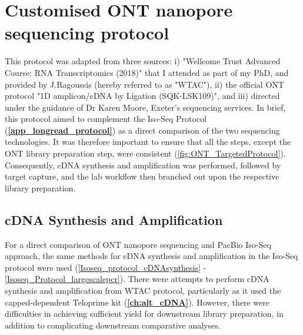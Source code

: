 \chapter{Customised ONT nanopore sequencing protocol}
\label{app_longread_ont_protocol}

\stoptocwriting
This protocol was adapted from three sources: i) "Wellcome Trust Advanced Course: RNA Transcriptomics (2018)" that I attended as part of my PhD, and provided by J.Ragoussis (hereby referred to as "WTAC"), ii) the official ONT protocol "1D amplicon/cDNA by Ligation (SQK-LSK109)", and iii) directed under the guidance of Dr Karen Moore, Exeter's sequencing services. In brief, this protocol aimed to complement the Iso-Seq Protocol (\textbf{\cref{app_longread_protocol}}) as a direct comparison of the two sequencing technologies. It was therefore important to ensure that all the steps, except the ONT library preparation step, were consistent (\cref{fig:ONT_TargetedProtocol}). Consequently, cDNA synthesis and amplification was performed, followed by target capture, and the lab workflow then branched out upon the respective library preparation.   

\section{cDNA Synthesis and Amplification}
For a direct comparison of ONT nanopore sequencing and PacBio Iso-Seq approach, the same methods for cDNA synthesis and amplification in the Iso-Seq protocol were used (\cref{Isoseq_protocol_cDNAsynthesis} - \cref{Isoseq_Protocol_largescalepcr}). There were attempts to perform cDNA synthesis and amplification from WTAC protocol, particularly as it used the capped-dependent Teloprime kit (\textbf{\cref{ch:alt_cDNA}}). However, there were difficulties in achieving sufficient yield for downstream library preparation, in addition to complicating downstream comparative analyses.


